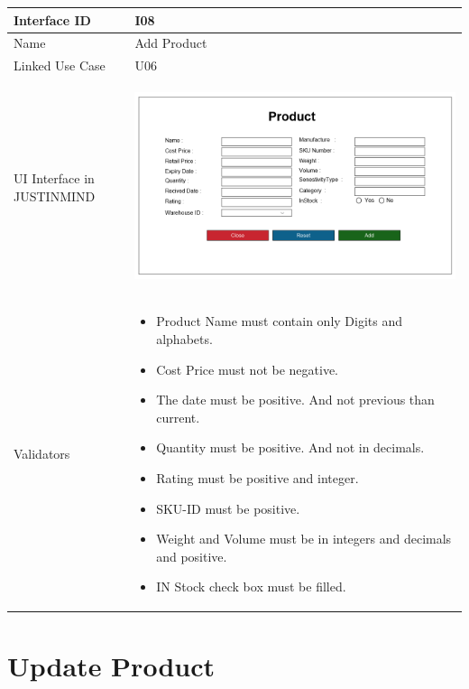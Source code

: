 \documentclass[12pt,a4paper]{report}
\begin{document}
\begin{tabular}{ | m{3cm} | m{12cm}| } \hline

Interface ID & I08  \\\hline

Name & Add Product  \\ \hline

Linked Use Case & U06	 \\ \hline

UI Interface in JUSTINMIND & \begin{center} \includegraphics[scale=0.3]{./UIs for Latex Reports/UI-008 Add Product@1x.png}\end{center}  \\ \hline

Validators & 
\begin{itemize}
\item   Product Name must contain only Digits and alphabets.
\item Cost Price must not be negative.
\item The date must be positive. And not previous than current.
\item Quantity must be positive. And not in decimals.
\item Rating must be positive and integer.
\item SKU-ID must be positive.
\item Weight and Volume must be in integers and decimals and positive.
\item IN Stock check box must be filled.


\end{itemize}
\\ \hline

\end{tabular} 
\section{Update Product }
\end{document}
